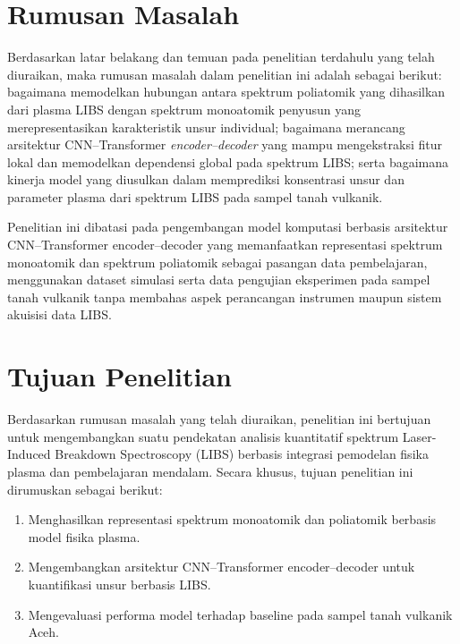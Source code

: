 
\section{Rumusan Masalah}
Berdasarkan latar belakang dan temuan pada penelitian terdahulu yang telah diuraikan, maka rumusan masalah dalam penelitian ini adalah sebagai berikut: bagaimana memodelkan hubungan antara spektrum poliatomik yang dihasilkan dari plasma LIBS dengan spektrum monoatomik penyusun yang merepresentasikan karakteristik unsur individual; bagaimana merancang arsitektur CNN--Transformer \textit{encoder--decoder} yang mampu mengekstraksi fitur lokal dan memodelkan dependensi global pada spektrum LIBS; serta bagaimana kinerja model yang diusulkan dalam memprediksi konsentrasi unsur dan parameter plasma dari spektrum LIBS pada sampel tanah vulkanik.

Penelitian ini dibatasi pada pengembangan model komputasi berbasis arsitektur CNN–Transformer encoder–decoder yang memanfaatkan representasi spektrum monoatomik dan spektrum poliatomik sebagai pasangan data pembelajaran, menggunakan dataset simulasi serta data pengujian eksperimen pada sampel tanah vulkanik tanpa membahas aspek perancangan instrumen maupun sistem akuisisi data LIBS.

\section{Tujuan Penelitian}
Berdasarkan rumusan masalah yang telah diuraikan, penelitian ini bertujuan untuk mengembangkan suatu pendekatan analisis kuantitatif spektrum Laser-Induced Breakdown Spectroscopy (LIBS) berbasis integrasi pemodelan fisika plasma dan pembelajaran mendalam. Secara khusus, tujuan penelitian ini dirumuskan sebagai berikut:
\begin{enumerate}
    \item Menghasilkan representasi spektrum monoatomik dan poliatomik berbasis model fisika plasma.
    \item Mengembangkan arsitektur CNN–Transformer encoder–decoder untuk kuantifikasi unsur berbasis LIBS.
    \item Mengevaluasi performa model terhadap baseline pada sampel tanah vulkanik Aceh.
\end{enumerate}

